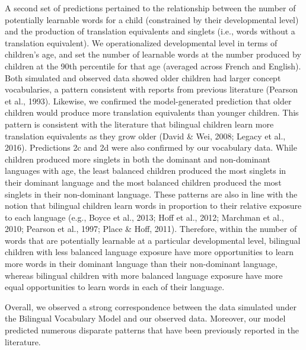 \documentclass[
  english,
  ,man,floatsintext]{apa6}
\begin{document}
A second set of predictions pertained to the relationship between the number of potentially learnable words for a child (constrained by their developmental level) and the production of translation equivalents and singlets (i.e., words without a translation equivalent). We operationalized developmental level in terms of children's age, and set the number of learnable words at the number produced by children at the 90th percentile for that age (averaged across French and English). Both simulated and observed data showed older children had larger concept vocabularies, a pattern consistent with reports from previous literature (Pearson et al., 1993). Likewise, we confirmed the model-generated prediction that older children would produce more translation equivalents than younger children. This pattern is consistent with the literature that bilingual children learn more translation equivalents as they grow older (David \& Wei, 2008; Legacy et al., 2016). Predictions 2c and 2d were also confirmed by our vocabulary data. While children produced more singlets in both the dominant and non-dominant languages with age, the least balanced children produced the most singlets in their dominant language and the most balanced children produced the most singlets in their non-dominant language. These patterns are also in line with the notion that bilingual children learn words in proportion to their relative exposure to each language (e.g., Boyce et al., 2013; Hoff et al., 2012; Marchman et al., 2010; Pearson et al., 1997; Place \& Hoff, 2011). Therefore, within the number of words that are potentially learnable at a particular developmental level, bilingual children with less balanced language exposure have more opportunities to learn more words in their dominant language than their non-dominant language, whereas bilingual children with more balanced language exposure have more equal opportunities to learn words in each of their language.

Overall, we observed a strong correspondence between the data simulated under the Bilingual Vocabulary Model and our observed data. Moreover, our model predicted numerous disparate patterns that have been previously reported in the literature.
\end{document}
